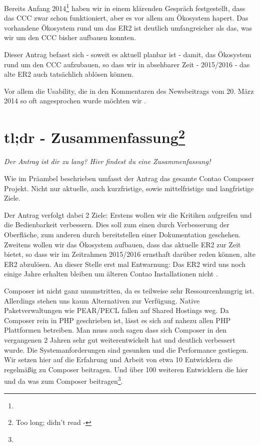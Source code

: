 \documentclass[
paper=a4,
draft=false,%
fontsize=10pt%
]{scrartcl}
\begin{document}
Bereits Anfang 2014\footnote{} haben wir in einem klärenden Gespräch festgestellt, dass das CCC zwar schon funktioniert, aber es vor allem am Ökosystem hapert. Das vorhandene Ökosystem rund um das ER2 ist deutlich umfangreicher als das, was wir um den CCC bisher aufbauen konnten.

Dieser Antrag befasst sich - soweit es aktuell planbar ist - damit, das Ökosystem rund um den CCC aufzubauen, so dass wir in absehbarer Zeit - 2015/2016 - das alte ER2 auch tatsächlich ablösen können.

Vor allem die  Usability, die in den Kommentaren des Newsbeitrags vom 20. März 2014 so oft angesprochen wurde möchten wir .

\pagebreak
\tableofcontents

%
%

\section[tl;dr - Zusammenfassung]{tl;dr - Zusammenfassung\footnote{Too long; didn't read -
}}

\textit{Der Antrag ist dir zu lang? Hier findest du eine Zusammenfassung!}

Wie im Präambel beschrieben umfasst der Antrag das gesamte Contao Composer Projekt. Nicht nur aktuelle, auch kurzfristige, sowie mittelfristige und langfristige Ziele.

Der Antrag verfolgt dabei 2 Ziele:
Erstens wollen wir die Kritiken aufgreifen und die Bedienbarkeit verbessern. Dies soll zum einen durch Verbesserung der Oberfläche, zum anderen durch bereitstellen einer Dokumentation geschehen.
Zweitens wollen wir das Ökosystem aufbauen, dass das aktuelle ER2 zur Zeit bietet, so dass wir im Zeitrahmen 2015/2016 ernsthaft darüber reden können, alte ER2 abzulösen. An dieser Stelle erst mal Entwarnung: Das ER2 wird uns noch einige Jahre erhalten bleiben um älteren Contao Installationen nicht .

Composer ist nicht ganz unumstritten, da es teilweise sehr Ressourcenhungrig ist. Allerdings stehen uns kaum Alternativen zur Verfügung. Native Paketverwaltungen wie PEAR/PECL fallen auf Shared Hostings weg. Da Composer rein in PHP geschrieben ist, lässt es sich auf nahezu allen PHP Plattformen betreiben. Man muss auch sagen dass sich Composer in den vergangenen 2 Jahren sehr gut weiterentwickelt hat und deutlich verbessert wurde. Die Systemanforderungen sind gesunken und die Performance gestiegen. Wir setzen hier auf die Erfahrung und Arbeit von etwa 10 Entwicklern die regelmäßig zu Composer beitragen. Und über 100 weiteren Entwicklern die hier und da was zum Composer beitragen\footnote{}.
\end{document}
